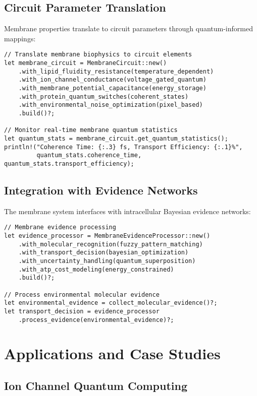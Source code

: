\documentclass[12pt,a4paper]{article}
\begin{document}
\subsection{Circuit Parameter Translation}

Membrane properties translate to circuit parameters through quantum-informed mappings:

\begin{verbatim}
// Translate membrane biophysics to circuit elements
let membrane_circuit = MembraneCircuit::new()
    .with_lipid_fluidity_resistance(temperature_dependent)
    .with_ion_channel_conductance(voltage_gated_quantum)
    .with_membrane_potential_capacitance(energy_storage)
    .with_protein_quantum_switches(coherent_states)
    .with_environmental_noise_optimization(pixel_based)
    .build()?;

// Monitor real-time membrane quantum statistics
let quantum_stats = membrane_circuit.get_quantum_statistics();
println!("Coherence Time: {:.3} fs, Transport Efficiency: {:.1}%", 
         quantum_stats.coherence_time, quantum_stats.transport_efficiency);
\end{verbatim}

\subsection{Integration with Evidence Networks}

The membrane system interfaces with intracellular Bayesian evidence networks:

\begin{verbatim}
// Membrane evidence processing
let evidence_processor = MembraneEvidenceProcessor::new()
    .with_molecular_recognition(fuzzy_pattern_matching)
    .with_transport_decision(bayesian_optimization)
    .with_uncertainty_handling(quantum_superposition)
    .with_atp_cost_modeling(energy_constrained)
    .build()?;

// Process environmental molecular evidence
let environmental_evidence = collect_molecular_evidence()?;
let transport_decision = evidence_processor
    .process_evidence(environmental_evidence)?;
\end{verbatim}

\section{Applications and Case Studies}

\subsection{Ion Channel Quantum Computing}
\end{document}
